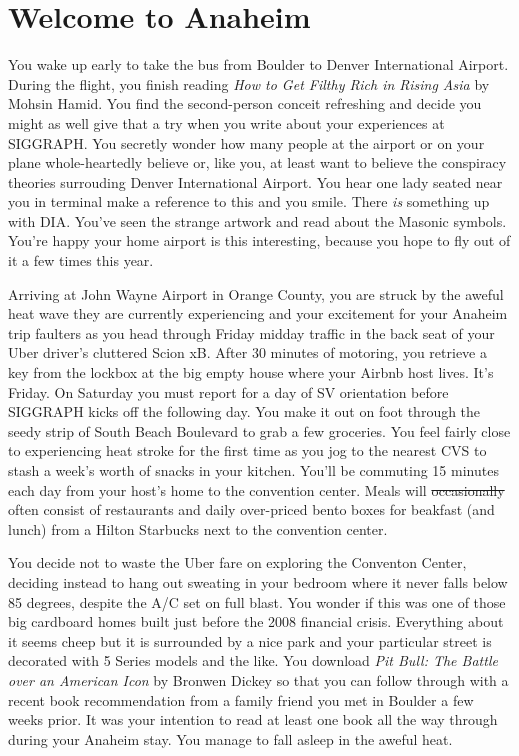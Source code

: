\documentclass[../main.tex]{subfiles}
\begin{document}
\section{Welcome to Anaheim}

You wake up early to take the bus from Boulder to Denver International Airport. During the flight, you finish reading \textit{How to Get Filthy Rich in Rising Asia} by Mohsin Hamid. You find the second-person conceit refreshing and decide you might as well give that a try when you write about your experiences at SIGGRAPH. You secretly wonder how many people at the airport or on your plane whole-heartedly believe or, like you, at least want to believe the conspiracy theories surrouding Denver International Airport. You hear one lady seated near you in terminal make a reference to this and you smile. There \textit{is} something up with DIA. You've seen the strange artwork and read about the Masonic symbols. You're happy your home airport is this interesting, because you hope to fly out of it a few times this year.

Arriving at John Wayne Airport in Orange County, you are struck by the aweful heat wave they are currently experiencing and your excitement for your Anaheim trip faulters as you head through Friday midday traffic in the back seat of your Uber driver's cluttered Scion xB. After 30 minutes of motoring, you retrieve a key from the lockbox at the big empty house where your Airbnb host lives. It's Friday. On Saturday you must report for a day of SV orientation before SIGGRAPH kicks off the following day. You make it out on foot through the seedy strip of South Beach Boulevard to grab a few groceries. You feel fairly close to experiencing heat stroke for the first time as you jog to the nearest CVS to stash a week's worth of snacks in your kitchen. You'll be commuting 15 minutes each day from your host's home to the convention center. Meals will \sout{occasionally} often consist of restaurants and daily over-priced bento boxes for beakfast (and lunch) from a Hilton Starbucks next to the convention center.

You decide not to waste the Uber fare on exploring the Conventon Center, deciding instead to hang out sweating in your bedroom where it never falls below 85 degrees, despite the A/C set on full blast. You wonder if this was one of those big cardboard homes built just before the 2008 financial crisis. Everything about it seems cheep but it is surrounded by a nice park and your particular street is decorated with 5 Series models and the like. You download \textit{Pit Bull: The Battle over an American Icon} by Bronwen Dickey so that you can follow through with a recent book recommendation from a family friend you met in Boulder a few weeks prior. It was your intention to read at least one book all the way through during your Anaheim stay. You manage to fall asleep in the aweful heat.
 
\end{document}
